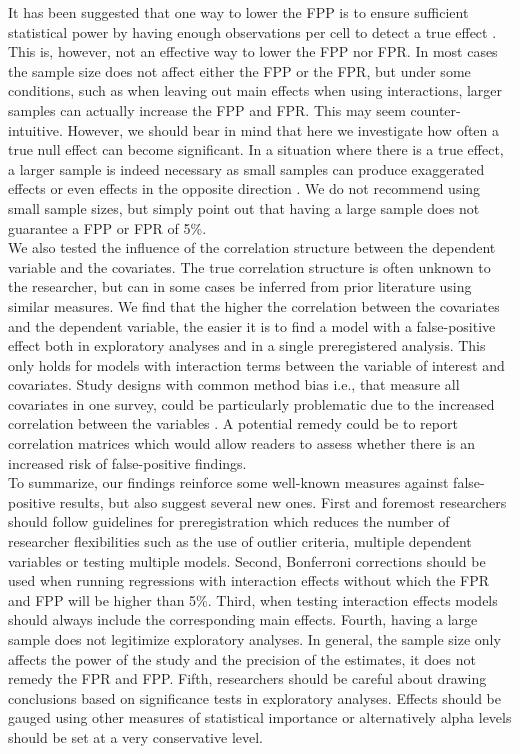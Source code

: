 It has been suggested that one way to lower the FPP is to ensure sufficient statistical power by having enough observations per cell to detect a true effect \citep{Simmons2011, simmons2018}. This is, however, not an effective way to lower the FPP nor FPR. In most cases the sample size does not affect either the FPP or the FPR, but under some conditions, such as when leaving out main effects when using interactions, larger samples can actually increase the FPP and FPR. This may seem counter-intuitive. However, we should bear in mind that here we investigate how often a true null effect can become significant. In a situation where there is a true effect, a larger sample is indeed necessary as small samples can produce exaggerated effects or even effects in the opposite direction \citep{gelman2014beyond}. We do not recommend using small sample sizes, but simply point out that having a large sample does not guarantee a FPP or FPR of 5\%. \\

We also tested the influence of the correlation structure between the dependent variable and the covariates. The true correlation structure is often unknown to the researcher, but can in some cases be inferred from prior literature using similar measures. We find that the higher the correlation between the covariates and the dependent variable, the easier it is to find a model with a false-positive effect both in exploratory analyses and in a single preregistered analysis. This only holds for models with interaction terms between the variable of interest and covariates. Study designs with common method bias i.e., that measure all covariates in one survey, could be particularly problematic due to the increased correlation between the variables \citep{podsakoff2003}. A potential remedy could be to report correlation matrices which would allow readers to assess whether there is an increased risk of false-positive findings.  \\ 

To summarize, our findings reinforce some well-known measures against false-positive results, but also suggest several new ones. First and foremost researchers should follow guidelines for preregistration \citep{Nosek2015,VANTVEER20162} which reduces the number of researcher flexibilities such as the use of outlier criteria, multiple dependent variables or testing multiple models. Second, Bonferroni corrections should be used when running regressions with interaction effects without which the FPR and FPP will be higher than 5\%. Third, when testing interaction effects models should always include the corresponding main effects. Fourth, having a large sample does not legitimize exploratory analyses. In general, the sample size only affects the power of the study and the precision of the estimates, it does not remedy the FPR and FPP. Fifth, researchers should be careful about drawing conclusions based on significance tests in exploratory analyses. Effects should be gauged using other measures of statistical importance or alternatively alpha levels should be set at a very conservative level. \\


